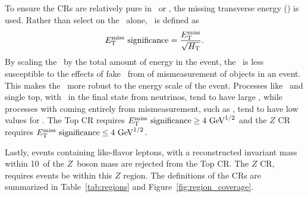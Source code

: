 To ensure the CRs are relatively pure in \TTBAR\ or \ZGAMMAJETS, the
missing transverse energy (\MET) is used.
Rather than select on the \MET\ alone, \METSIG\ is defined as
\begin{equation}
  E_{\mathrm{T}}^{\mathrm{miss}}~\text{significance} = \frac{E_{\mathrm{T}}^{\mathrm{miss}}}{\sqrt{H_{\mathrm{T}}}}.
\end{equation}
By scaling the \MET\ by the total amount of energy in the event, the
\METSIG\ is less susceptible to the effects of fake \MET\ from of mismeasurement
of objects in an event.
This makes the \METSIG\ more robust to the energy scale of the event.
Processes like \TTBAR\ and single top, with \MET\ in the final state from
neutrinos, tend
to have large \METSIG, while processes with \MET coming entirely from
mismeasurement, such as \ZGAMMAJETS, tend to have low values for \METSIG.
The Top CR requires $\METSIG \geq 4 \GeV^{1/2}$
and the $Z$ CR requires $\METSIG \leq 4 \GeV^{1/2}$.

Lastly, events containing like-flavor leptons, with a reconstructed invariant
mass within 10~\GeV of the $Z$~boson mass are rejected from the Top CR.
The $Z$ CR, requires events be within this $Z$ region.
The definitions of the CRs are summarized in Table~\ref{tab:regions} and
Figure~\ref{fig:region_coverage}.

